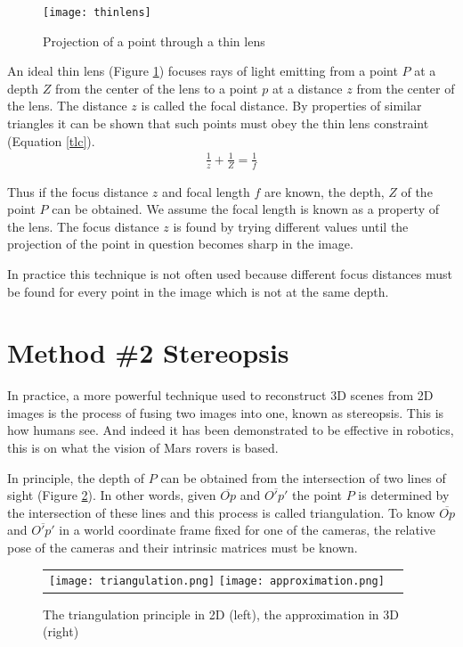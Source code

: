 \documentclass[twoside]{article}
\begin{document}
\begin{figure}[h!]
  \begin{center}
    \texttt{[image: thinlens]}
  \end{center}
  \caption{Projection of a point through a thin lens}
  \label{lens}
\end{figure}

An ideal thin lens (Figure \ref{lens}) focuses rays of light emitting from a point $P$ at a depth $Z$ from the center of the lens to a point $p$ at a distance $z$ from the center of the lens. The distance $z$ is called the focal distance. By properties of similar triangles it can be shown that such points must obey the thin lens constraint (Equation \ref{tlc}).
\begin{align}
  \label{tlc}
  \frac{1}{z} + \frac{1}{Z} = \frac{1}{f}
\end{align}

Thus if the focus distance $z$ and focal length $f$ are known, the depth, $Z$ of the point $P$ can be obtained. We assume the focal length is known as a property of the lens. The focus distance $z$ is found by trying different values until the projection of the point in question becomes sharp in the image.

In practice this technique is not often used because different focus distances must be found for every point in the image which is not at the same depth.

\section{Method \#2 Stereopsis}

In practice, a more powerful technique used to reconstruct 3D scenes from 2D images is the process of fusing two images into one, known as stereopsis. This is how humans see. And indeed it has been demonstrated to be effective in robotics, this is on what the vision of Mars rovers is based.

In principle, the depth of $P$ can be obtained from the intersection of two lines of sight (Figure \ref{triangle}). In other words, given $\overline{Op}$ and $\overline{O'p'}$ the point $P$ is determined by the intersection of these lines and this process is called triangulation. To know $\overline{Op}$ and $\overline{O'p'}$ in a  world coordinate frame fixed for one of the cameras, the relative pose of the cameras and their intrinsic matrices must be known.

\begin{figure}[h!]
  \begin{center}
	\begin{tabular}{cc}
	  \texttt{[image: triangulation.png]}
	  \texttt{[image: approximation.png]}
	\end{tabular}
  \end{center}
  \caption{The triangulation principle in 2D (left), the approximation in 3D (right)}
  \label{triangle}
\end{figure}
\end{document}

